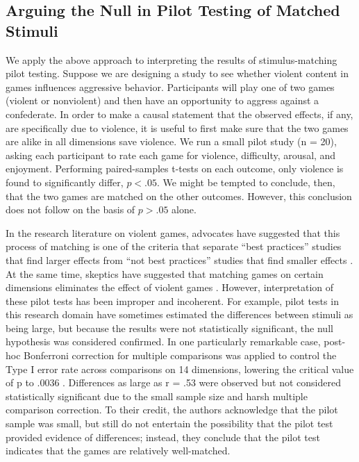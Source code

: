 \documentclass[fignum,nobf,man]{apa}
\begin{document}
\subsection{Arguing the Null in Pilot Testing of Matched Stimuli}
We apply the above approach to interpreting the results of stimulus-matching pilot testing.  Suppose we are designing a study to see whether violent content in games influences aggressive behavior. Participants will play one of two games (violent or nonviolent) and then have an opportunity to aggress against a confederate. In order to make a causal statement that the observed effects, if any, are specifically due to violence, it is useful to first make sure that the two games are alike in all dimensions save violence. We run a small pilot study (n = 20), asking each participant to rate each game for violence, difficulty, arousal, and enjoyment. Performing paired-samples t-tests on each outcome, only violence is found to significantly differ, $p < .05$. We might be tempted to conclude, then, that the two games are matched on the other outcomes. However, this conclusion does not follow on the basis of $p > .05$ alone.

In the research literature on violent games, advocates have suggested that this process of matching is one of the criteria that separate ``best practices'' studies that find larger effects from ``not best practices'' studies that find smaller effects \citep{Anderson:etal:2010}. At the same time, skeptics have suggested that matching games on certain dimensions eliminates the effect of violent games \citep{Adachi:Willoughby:2011}. However, interpretation of these pilot tests has been improper and incoherent. For example, pilot tests in this research domain have sometimes estimated the differences between stimuli as being large, but because the results were not statistically significant, the null hypothesis was considered confirmed. In one particularly remarkable case, post-hoc Bonferroni correction for multiple comparisons was applied to control the Type I error rate across comparisons on 14 dimensions, lowering the critical value of p to .0036 \citep{Arriaga:etal:2008}. Differences as large as r = .53 were observed but not considered statistically significant due to the small sample size and harsh multiple comparison correction. To their credit, the authors acknowledge that the pilot sample was small, but still do not entertain the possibility that the pilot test provided evidence of differences; instead, they conclude that the pilot test indicates that the games are relatively well-matched.
\end{document}
